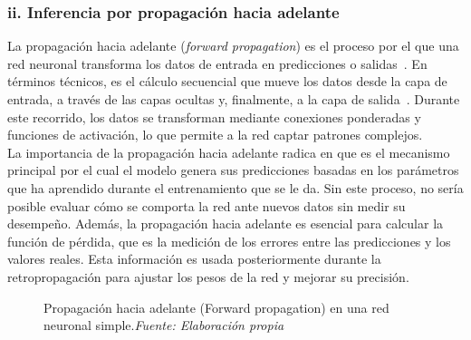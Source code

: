 \documentclass[11pt]{article} %
\begin{document}
\subsubsection{ii. Inferencia por propagación hacia adelante}
La propagación hacia adelante (\textit{forward propagation}) es el proceso por el que una red neuronal transforma los datos de entrada en predicciones o salidas~\cite{datacamp_redes}. En términos técnicos, es el cálculo secuencial que mueve los datos desde la capa de entrada, a través de las capas ocultas y, finalmente, a la capa de salida~\cite{nvidia}. Durante este recorrido, los datos se transforman mediante conexiones ponderadas y funciones de activación, lo que permite a la red captar patrones complejos. \\
La importancia de la propagación hacia adelante radica en que es el mecanismo principal por el cual el modelo genera sus predicciones basadas en los parámetros que ha aprendido durante el entrenamiento que se le da. Sin este proceso, no sería posible evaluar cómo se comporta la red ante nuevos datos sin medir su desempeño. Además, la propagación hacia adelante es esencial para calcular la función de pérdida, que es la medición de los errores entre las predicciones y los valores reales. Esta información es usada posteriormente durante la retropropagación  para ajustar los pesos de la red y mejorar su precisión.
\begin{figure}[H]
    \centering
    \caption{Propagación hacia adelante (Forward propagation) en una red neuronal simple.\textit{Fuente: Elaboración propia}}
    \label{fig:forward_propagation}
\end{figure}
\end{document}

